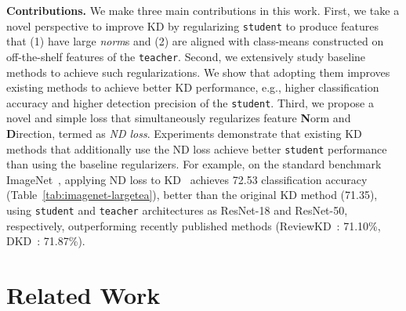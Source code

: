 \documentclass{article}
\begin{document}
%
 





{\bf Contributions.}
We make three main contributions in this work. 
First, we take a novel perspective to improve KD by regularizing {\tt student} to produce features that 
(1) have large \emph{norm}s and (2) are aligned with class-means constructed on off-the-shelf features of the {\tt teacher}.
Second, we extensively study baseline methods to achieve such regularizations.
We show that adopting them improves existing methods to achieve better KD performance, e.g., higher classification accuracy and higher detection precision of the {\tt student}.
Third, we propose a novel and simple loss that simultaneously regularizes feature \textbf{N}orm and \textbf{D}irection, termed as {\em ND loss}.
Experiments demonstrate that existing KD methods that additionally use the ND loss achieve better {\tt student} performance than using the baseline regularizers. 
For example, on the standard benchmark ImageNet~\cite{deng2009imagenet},
applying ND loss to KD~\cite{hinton2015distilling} achieves 72.53 classification accuracy (Table~\ref{tab:imagenet-largetea}), 
better than the original KD method (71.35),
using {\tt student} and {\tt teacher} architectures as ResNet-18 and ResNet-50, respectively, outperforming recently published methods (ReviewKD~\cite{chen2021distilling}: 71.10\%, DKD~\cite{zhao2022decoupled}: 71.87\%).

























 






\section{Related Work\vspace{-1mm}}
\end{document}
